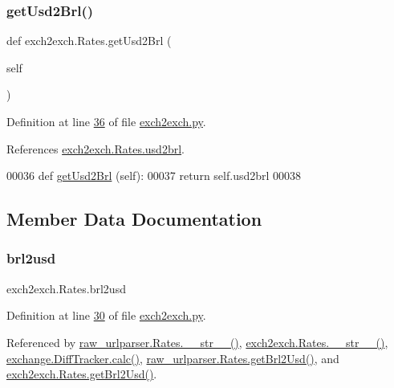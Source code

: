 \subsubsection{\texorpdfstring{get\+Usd2\+Brl()}{getUsd2Brl()}}
{\footnotesize\ttfamily def exch2exch.\+Rates.\+get\+Usd2\+Brl (\begin{DoxyParamCaption}\item[{}]{self }\end{DoxyParamCaption})}



Definition at line \hyperlink{exch2exch_8py_source_l00036}{36} of file \hyperlink{exch2exch_8py_source}{exch2exch.\+py}.



References \hyperlink{exch2exch_8py_source_l00029}{exch2exch.\+Rates.\+usd2brl}.


\begin{DoxyCode}
00036     \textcolor{keyword}{def }\hyperlink{namespacerates_ae4c7203ef8a919f9cf522581ca00b08a}{getUsd2Brl} (self):
00037         \textcolor{keywordflow}{return} self.usd2brl
00038     
\end{DoxyCode}


\subsection{Member Data Documentation}
\mbox{\label{classexch2exch_1_1_rates_acc018dea09e825e18e91c73c5c63ab78}} 
\subsubsection{\texorpdfstring{brl2usd}{brl2usd}}
{\footnotesize\ttfamily exch2exch.\+Rates.\+brl2usd}



Definition at line \hyperlink{exch2exch_8py_source_l00030}{30} of file \hyperlink{exch2exch_8py_source}{exch2exch.\+py}.



Referenced by \hyperlink{raw__urlparser_8py_source_l00038}{raw\+\_\+urlparser.\+Rates.\+\_\+\+\_\+str\+\_\+\+\_\+()}, \hyperlink{exch2exch_8py_source_l00042}{exch2exch.\+Rates.\+\_\+\+\_\+str\+\_\+\+\_\+()}, \hyperlink{exchange_8py_source_l00309}{exchange.\+Diff\+Tracker.\+calc()}, \hyperlink{raw__urlparser_8py_source_l00029}{raw\+\_\+urlparser.\+Rates.\+get\+Brl2\+Usd()}, and \hyperlink{exch2exch_8py_source_l00033}{exch2exch.\+Rates.\+get\+Brl2\+Usd()}.

